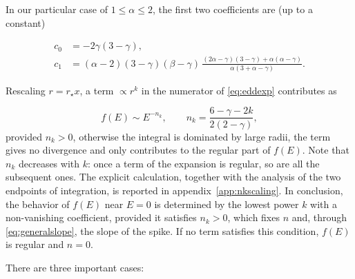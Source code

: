 In our particular case of $1 \le \alpha \le 2$, the first two coefficients are (up to a constant)

\begin{equation} \label{eq:coeffs}
\begin{aligned}
c_0 &= -2\gamma(3-\gamma), \\[4pt]
c_1 &= (\alpha-2)(3-\gamma)(\beta-\gamma)\,
\frac{(2\alpha-\gamma)(3-\gamma) + \alpha(\alpha-\gamma)}{\alpha(3+\alpha-\gamma)}.
\end{aligned}
\end{equation}



Rescaling $r = r_\star x$, a term
$\propto r^{k}$ in the numerator of \cref{eq:eddexp} contributes as


\begin{equation}
f(E) \sim E^{-n_k},
\qquad
n_k = \frac{6-\gamma-2k}{2(2-\gamma)},
\end{equation}
provided $n_k > 0$, otherwise the integral is dominated by large radii,
the term gives no divergence and only
contributes to the regular part of $f(E)$. 
Note that $n_k$ decreases with
$k$: once a term of the expansion is regular, so are all the subsequent
ones.
The explicit calculation, together with the analysis of the two endpoints
of integration, is reported in appendix~\ref{app:nkscaling}.
In conclusion, the behavior of $f(E)$ near
$E = 0$ is determined by the lowest power $k$ with
a non-vanishing coefficient, provided it satisfies $n_k > 0$, which fixes $n$ and, through
\cref{eq:generalslope}, the slope of the spike. If no term satisfies this condition, $f(E)$ is regular and
$n = 0$.

There are three important cases:



